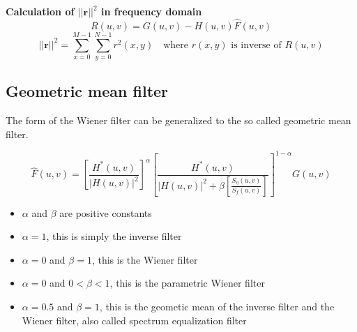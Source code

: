 \textbf{Calculation of $||\mathbf{r}||^2$ in frequency domain}
	\begin{equation}
		R(u,v) = G(u,v) - H(u,v)\hat{F}(u,v)
	\end{equation}
	\begin{equation}
		||\mathbf{r}||^2 = \sum\limits_{x=0}^{M-1} \sum\limits_{y=0}^{N-1} r^{2}(x,y) \quad \textrm{where } r(x,y) \textrm{ is inverse of } R(u,v) 
		\label{eq:rCalculateFreq}
	\end{equation}

\subsection{Geometric mean filter }
The form of the Wiener filter can be generalized to the so called geometric mean filter.

\begin{equation}
	\hat{F}(u,v) =  \left[ \frac{H^*(u,v)}{|H(u,v)|^2} \right]^{\alpha}  \left[ \frac{H^*(u,v)}{|H(u,v)|^2 + \beta \left[ \frac{S_\eta(u,v)}{S_f(u,v)}\right]} \right]^{1-\alpha} G(u,v)
\end{equation}

\begin{itemize}
	\item $\alpha$ and $\beta$ are positive constants
	\item $\alpha = 1$, this is simply the inverse filter
	\item $\alpha=0$ and $\beta=1$, this is the Wiener filter
	\item $\alpha=0$ and $0 < \beta < 1$, this is the parametric Wiener filter
	\item $\alpha=0.5$ and $\beta=1$, this is the geometic mean of the inverse filter and the Wiener filter, also called spectrum equalization filter
\end{itemize}

